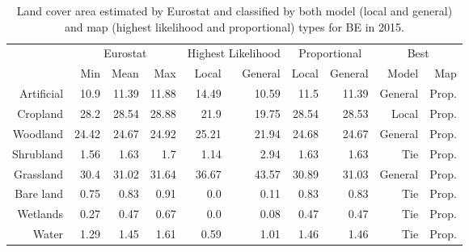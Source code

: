 \begin{table}[H]
\centering
\caption{Land cover area estimated by Eurostat and classified by both model (local and general) and map (highest likelihood and proportional) types for BE in 2015.}

\begin{tabular}{r|rrr|rr|rr|rr}
\toprule
{} & \multicolumn{3}{|c}{Eurostat} & \multicolumn{2}{|c}{Highest Likelihood} & \multicolumn{2}{|c}{Proportional} & \multicolumn{2}{|c}{Best} \\
{} &      Min &   Mean &    Max &              Local & General &        Local & General &    Model &    Map \\
\midrule
Artificial &     10.9 &  11.39 &  11.88 &              14.49 &   10.59 &         11.5 &   11.39 &  General &  Prop. \\
Cropland   &     28.2 &  28.54 &  28.88 &               21.9 &   19.75 &        28.54 &   28.53 &    Local &  Prop. \\
Woodland   &    24.42 &  24.67 &  24.92 &              25.21 &   21.94 &        24.68 &   24.67 &  General &  Prop. \\
Shrubland  &     1.56 &   1.63 &    1.7 &               1.14 &    2.94 &         1.63 &    1.63 &      Tie &  Prop. \\
Grassland  &     30.4 &  31.02 &  31.64 &              36.67 &   43.57 &        30.89 &   31.03 &  General &  Prop. \\
Bare land  &     0.75 &   0.83 &   0.91 &                0.0 &    0.11 &         0.83 &    0.83 &      Tie &  Prop. \\
Wetlands   &     0.27 &   0.47 &   0.67 &                0.0 &    0.08 &         0.47 &    0.47 &      Tie &  Prop. \\
Water      &     1.29 &   1.45 &   1.61 &               0.59 &    1.01 &         1.46 &    1.46 &      Tie &  Prop. \\
\bottomrule
\end{tabular}
\end{table}

